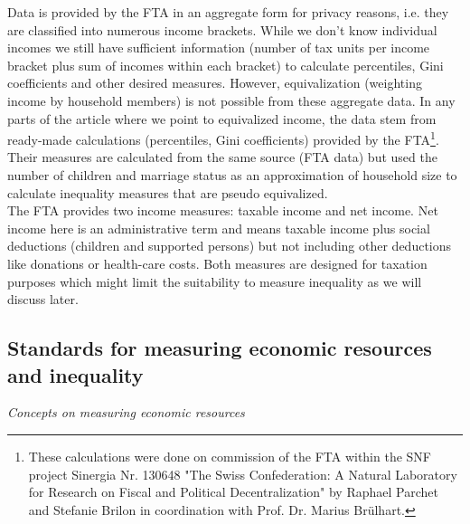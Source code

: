 \documentclass[twoside]{article}\usepackage[]{graphicx}\usepackage[]{color}
\begin{document}
\begin{multicols}{2}
Data is provided by the FTA in an aggregate form for privacy reasons, i.e. they are classified into numerous income brackets. While we don't know individual incomes we still have sufficient information (number of tax units per income bracket plus sum of incomes within each bracket) to calculate percentiles, Gini coefficients and other desired measures. However, equivalization (weighting income by household members) is not possible from these aggregate data. In any parts of the article where we point to equivalized income, the data stem from ready-made calculations (percentiles, Gini coefficients) provided by the FTA\footnote{These calculations were done on commission of the FTA within the SNF project Sinergia Nr. 130648 "The Swiss Confederation: A Natural Laboratory for Research on Fiscal and Political Decentralization" by Raphael Parchet and Stefanie Brilon in coordination with Prof. Dr. Marius Brülhart.}. Their measures are calculated from the same source (FTA data) but used the number of children and marriage status as an approximation of household size to calculate inequality measures that are pseudo equivalized. \\


The FTA provides two income measures: taxable income and net income. Net income here is an administrative term and means taxable income plus social deductions (children and supported persons) but not including other deductions like donations or health-care costs. Both measures are designed for taxation purposes which might limit the suitability to measure inequality as we will discuss later.




\subsection{Standards for measuring economic resources and inequality}

\emph{Concepts on measuring economic resources}  \\


\end{multicols}
\end{document}
